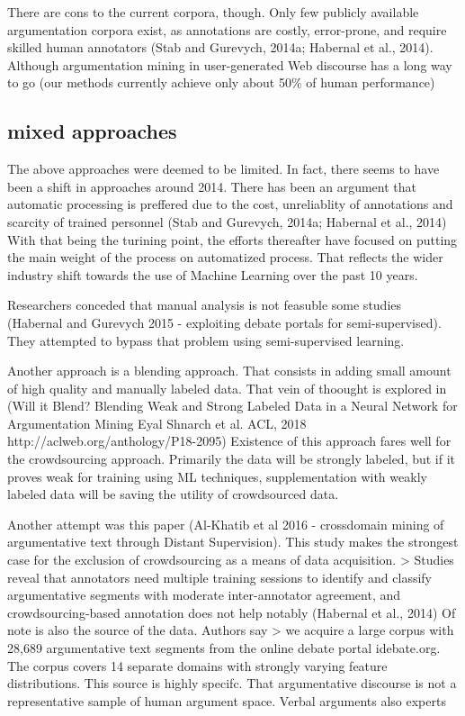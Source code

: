 \documentclass{article}
\begin{document}
There are cons to the current corpora, though.
Only few publicly available argumentation corpora exist, as annotations are costly, error-prone, and require skilled human annotators (Stab and Gurevych, 2014a; Habernal et al., 2014).
Although argumentation mining in user-generated Web discourse has a long way to go (our methods currently achieve only about 50\% of human performance)

\subsection{mixed approaches}
The above approaches were deemed to be limited. In fact, there seems to have been a shift in approaches around 2014.
There has been an argument that automatic processing is preffered due to the cost, unreliablity of annotations and scarcity of trained personnel
(Stab and Gurevych, 2014a; Habernal et al., 2014)
With that being the turining point, the efforts thereafter have focused on putting the main weight of the process on automatized process. 
That reflects the wider industry shift towards the use of Machine Learning over the past 10 years.

Researchers conceded that manual analysis is not feasuble some studies (Habernal and Gurevych 2015 - exploiting debate portals for semi-supervised).
They attempted to bypass that problem using semi-supervised learning.

Another approach is a blending approach. That consists in adding small amount of high quality and manually labeled data.
That vein of thoought is explored in (Will it Blend? Blending Weak and Strong Labeled Data in a Neural Network for Argumentation Mining Eyal Shnarch et al.
ACL, 2018 http://aclweb.org/anthology/P18-2095)
Existence of this approach fares well for the crowdsourcing approach. Primarily the data will be strongly labeled, but if it proves weak for training using ML techniques, 
supplementation with weakly labeled data will be saving the utility of crowdsourced data.

Another attempt was this paper (Al-Khatib et al 2016 - crossdomain mining of argumentative text through Distant Supervision).
This study makes the strongest case for the exclusion of crowdsourcing as a means of data acquisition.
> Studies reveal that annotators need multiple training sessions to identify and classify argumentative segments with moderate inter-annotator agreement, and crowdsourcing-based annotation does not help notably (Habernal et al., 2014)
Of note is also the source of the data. Authors say
> we acquire a large corpus with 28,689 argumentative text segments from the online debate portal idebate.org. The corpus covers 14 separate domains with strongly varying feature distributions.
This source is highly specifc. That argumentative discourse is not a representative sample of human argument space. Verbal arguments
also experts 
\end{document}
